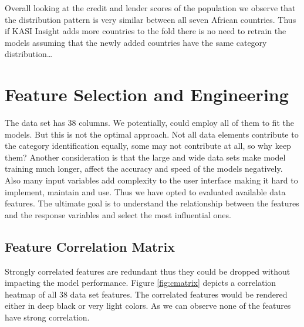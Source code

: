Overall looking at the credit and lender scores of the population we
observe that the distribution pattern is very similar between all seven
African countries. Thus if KASI Insight adds more countries to the fold
there is no need to retrain the models assuming that the newly added
countries have the same category distribution\ldots{}

\hypertarget{feature-selection-and-engineering}{%
\section{Feature Selection and
Engineering}\label{feature-selection-and-engineering}}

The data set has 38 columns. We potentially, could employ all of them to
fit the models. But this is not the optimal approach. Not all data
elements contribute to the category identification equally, some may not
contribute at all, so why keep them? Another consideration is that the
large and wide data sets make model training much longer, affect the
accuracy and speed of the models negatively. Also many input variables
add complexity to the user interface making it hard to implement,
maintain and use. Thus we have opted to evaluated available data
features. The ultimate goal is to understand the relationship between
the features and the response variables and select the most influential
ones.

\hypertarget{feature-correlation-matrix}{%
\subsection{Feature Correlation
Matrix}\label{feature-correlation-matrix}}

Strongly correlated features are redundant thus they could be dropped
without impacting the model performance. Figure \ref{fig:cmatrix}
depicts a correlation heatmap of all 38 data set features. The
correlated features would be rendered either in deep black or very light
colors. As we can observe none of the features have strong correlation.

